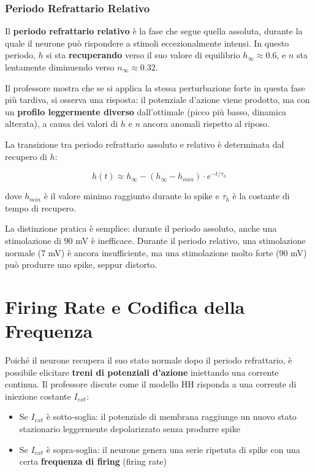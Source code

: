 \subsubsection{Periodo Refrattario Relativo}

Il \textbf{periodo refrattario relativo} è la fase che segue quella assoluta, durante la quale il neurone può rispondere a stimoli eccezionalmente intensi. In questo periodo, $h$ si sta \textbf{recuperando} verso il suo valore di equilibrio $h_\infty \approx 0.6$, e $n$ sta lentamente diminuendo verso $n_\infty \approx 0.32$.

Il professore mostra che se si applica la stessa perturbazione forte in questa fase più tardiva, si osserva una risposta: il potenziale d'azione viene prodotto, ma con un \textbf{profilo leggermente diverso} dall'ottimale (picco più basso, dinamica alterata), a causa dei valori di $h$ e $n$ ancora anomali rispetto al riposo.

La transizione tra periodo refrattario assoluto e relativo è determinata dal recupero di $h$:

\begin{equation}
h(t) \approx h_\infty - (h_\infty - h_{min}) \cdot e^{-t/\tau_h}
\end{equation}

dove $h_{min}$ è il valore minimo raggiunto durante lo spike e $\tau_h$ è la costante di tempo di recupero.

\begin{tcolorbox}[colback=gray!5, colframe=gray!40, arc=2mm, boxrule=0.5pt]
La distinzione pratica è semplice: durante il periodo assoluto, anche una stimolazione di 90 mV è inefficace. Durante il periodo relativo, una stimolazione normale (7 mV) è ancora insufficiente, ma una stimolazione molto forte (90 mV) può produrre uno spike, seppur distorto.
\end{tcolorbox}



\section{Firing Rate e Codifica della Frequenza}


Poiché il neurone recupera il suo stato normale dopo il periodo refrattario, è possibile elicitare \textbf{treni di potenziali d'azione} iniettando una corrente continua. Il professore discute come il modello HH risponda a una corrente di iniezione costante $I_{ext}$:

\begin{itemize}
    \item Se $I_{ext}$ è sotto-soglia: il potenziale di membrana raggiunge un nuovo stato stazionario leggermente depolarizzato senza produrre spike
    \item Se $I_{ext}$ è sopra-soglia: il neurone genera una serie ripetuta di spike con una certa \textbf{frequenza di firing} (firing rate)
\end{itemize}

